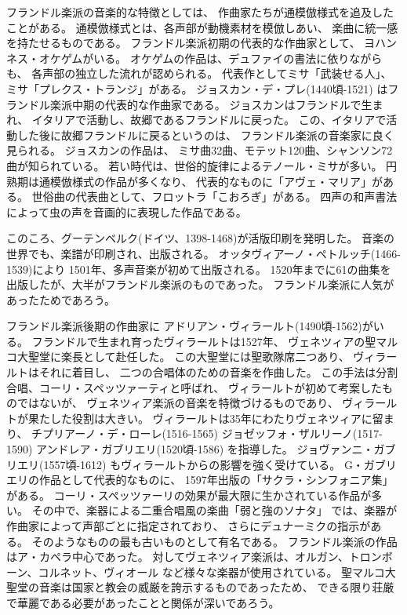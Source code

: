 \documentclass[a4j]{jarticle}
\begin{document}
フランドル楽派の音楽的な特徴としては、
作曲家たちが通模倣様式を追及したことがある。
通模倣様式とは、各声部が動機素材を模倣しあい、
楽曲に統一感を持たせるものである。
フランドル楽派初期の代表的な作曲家として、
ヨハンネス・オケゲムがいる。
オケゲムの作品は、デュファイの書法に依りながらも、
各声部の独立した流れが認められる。
代表作としてミサ「武装せる人」、
ミサ「プレクス・トランジ」がある。
ジョスカン・デ・プレ(1440頃-1521)
はフランドル楽派中期の代表的な作曲家である。
ジョスカンはフランドルで生まれ、
イタリアで活動し、故郷であるフランドルに戻った。
この、イタリアで活動した後に故郷フランドルに戻るというのは、
フランドル楽派の音楽家に良く見られる。
ジョスカンの作品は、
ミサ曲32曲、モテット120曲、シャンソン72曲が知られている。
若い時代は、世俗的旋律によるテノール・ミサが多い。
円熟期は通模倣様式の作品が多くなり、
代表的なものに「アヴェ・マリア」がある。
世俗曲の代表曲として、フロットラ「こおろぎ」がある。
四声の和声書法によって虫の声を音画的に表現した作品である。

このころ、グーテンベルク(ドイツ、1398-1468)が活版印刷を発明した。
音楽の世界でも、楽譜が印刷され、出版される。
オッタヴィアーノ・ペトルッチ(1466-1539)により
1501年、多声音楽が初めて出版される。
1520年までに61の曲集を出版したが、大半がフランドル楽派のものであった。
フランドル楽派に人気があったためであろう。

フランドル楽派後期の作曲家に
アドリアン・ヴィラールト(1490頃-1562)がいる。
フランドルで生まれ育ったヴィラールトは1527年、
ヴェネツィアの聖マルコ大聖堂に楽長として赴任した。
この大聖堂には聖歌隊席二つあり、
ヴィラールトはそれに着目し、
二つの合唱体のための音楽を作曲した。
この手法は分割合唱、コーリ・スペッツァーティと呼ばれ、
ヴィラールトが初めて考案したものではないが、
ヴェネツィア楽派の音楽を特徴づけるものであり、
ヴィラールトが果たした役割は大きい。
ヴィラールトは35年にわたりヴェネツィアに留まり、
チプリアーノ・デ・ローレ(1516-1565)
ジョゼッフォ・ザルリーノ(1517-1590)
アンドレア・ガブリエリ(1520頃-1586)
を指導した。
ジョヴァンニ・ガブリエリ(1557頃-1612)
もヴィラールトからの影響を強く受けている。
G・ガブリエリの作品として代表的なものに、
1597年出版の「サクラ・シンフォニア集」がある。
コーリ・スペッツァーリの効果が最大限に生かされている作品が多い。
その中で、楽器による二重合唱風の楽曲「弱と強のソナタ」
では、楽器が作曲家によって声部ごとに指定されており、
さらにデュナーミクの指示がある。
そのようなものの最も古いものとして有名である。
フランドル楽派の作品はア・カペラ中心であった。
対してヴェネツィア楽派は、オルガン、トロンボーン、コルネット、ヴィオール
など様々な楽器が使用されている。
聖マルコ大聖堂の音楽は国家と教会の威厳を誇示するものであったため、
できる限り荘厳で華麗である必要があったことと関係が深いであろう。
\end{document}
